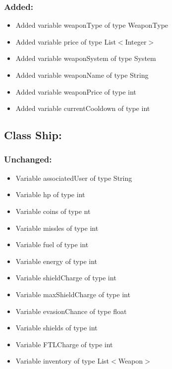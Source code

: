 \documentclass{article}
\begin{document}
\subsubsection{Added:}
\begin{itemize}
\item Added variable weaponType of type WeaponType
\item Added variable price of type List$<$Integer$>$
\item Added variable weaponSystem of type System
\item Added variable weaponName of type String
\item Added variable weaponPrice of type int
\item Added variable currentCooldown of type int
\end{itemize}


\subsection{Class Ship:}

\subsubsection{Unchanged:}
\begin{itemize}
\item Variable associatedUser of type String
\item Variable hp of type int
\item Variable coins of type nt
\item Variable missles of type int
\item Variable fuel of type int
\item Variable energy of type int
\item Variable shieldCharge of type int
\item Variable maxShieldCharge of type int
\item Variable evasionChance of type float
\item Variable shields of type int
\item Variable FTLCharge of type int
\item Variable inventory of type List$<$Weapon$>$
\end{itemize}
\end{document}
